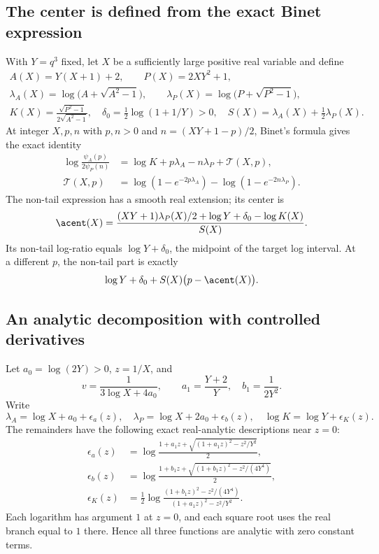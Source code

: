 \documentclass[11pt,letterpaper]{article}
\theoremstyle{definition}\newtheorem{definition}[theorem]{Definition}
\theoremstyle{remark}\newtheorem{remark}[theorem]{Remark}
\begin{document}
\subsection{The center is defined from the exact Binet expression}
With $Y=q^3$ fixed, let $X$ be a sufficiently large positive real variable and define
\begin{equation}\label{fup:nr:eq:analyticdefs}
 \begin{gathered}
 A(X)=Y(X+1)+2,\qquad P(X)=2XY^2+1,\\
 \lambda_A(X)=\log\bigl(A+\sqrt{A^2-1}\bigr),\qquad
 \lambda_P(X)=\log\bigl(P+\sqrt{P^2-1}\bigr),\\
 K(X)=\frac{\sqrt{P^2-1}}{2\sqrt{A^2-1}},\quad
 \delta_0=\frac12\log(1+1/Y)>0,\quad
 S(X)=\lambda_A(X)+\frac12\lambda_P(X).
 \end{gathered}
\end{equation}
At integer $X,p,n$ with $p,n>0$ and $n=(XY+1-p)/2$, Binet's formula gives the exact identity
\begin{align}\label{fup:nr:eq:logratio}
 \log\frac{\psi_A(p)}{2\psi_P(n)}
 &=\log K+p\lambda_A-n\lambda_P+\mathcal T(X,p),\\
 \mathcal T(X,p)
 &=\log(1-e^{-2p\lambda_A})-\log(1-e^{-2n\lambda_P}).\nonumber
\end{align}
The non-tail expression has a smooth real extension; its center is
\begin{equation}\label{fup:nr:eq:center}
 \acent(X)=\frac{(XY+1)\lambda_P(X)/2+\log Y+\delta_0-\log K(X)}{S(X)}.
\end{equation}
Its non-tail log-ratio equals $\log Y+\delta_0$, the midpoint of the target log interval. At a different $p$, the non-tail part is exactly
\begin{equation}\label{fup:nr:eq:affinelog}
 \log Y+\delta_0+S(X)\bigl(p-\acent(X)\bigr).
\end{equation}
\subsection{An analytic decomposition with controlled derivatives}
Let $a_0=\log(2Y)>0$, $z=1/X$, and
\[
 v=\frac1{3\log X+4a_0},\qquad a_1=\frac{Y+2}{Y},\quad b_1=\frac1{2Y^2}.
\]
Write
\[
 \lambda_A=\log X+a_0+\epsilon_a(z),\quad
 \lambda_P=\log X+2a_0+\epsilon_b(z),\quad
 \log K=\log Y+\epsilon_K(z).
\]
The remainders have the following exact real-analytic descriptions near $z=0$:
\begin{align}\label{fup:nr:eq:eps}
 \epsilon_a(z)&=\log\frac{1+a_1z+\sqrt{(1+a_1z)^2-z^2/Y^2}}2,\\
 \epsilon_b(z)&=\log\frac{1+b_1z+\sqrt{(1+b_1z)^2-z^2/(4Y^4)}}2,\nonumber\\
 \epsilon_K(z)&=\frac12\log\frac{(1+b_1z)^2-z^2/(4Y^4)}{(1+a_1z)^2-z^2/Y^2}.\nonumber
\end{align}
Each logarithm has argument $1$ at $z=0$, and each square root uses the real branch equal to $1$ there. Hence all three functions are analytic with zero constant terms.
\end{document}
